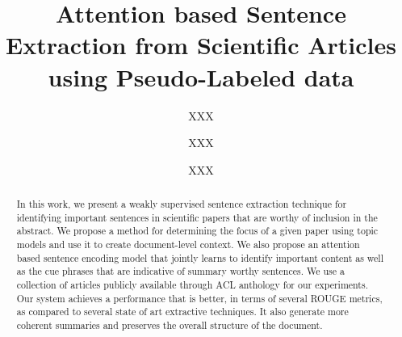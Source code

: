 \documentclass[sigconf]{acmart}
\begin{document}
\title{Attention based Sentence Extraction from Scientific Articles using Pseudo-Labeled data}


\author{XXX}


\author{XXX}

\author{XXX}


\begin{abstract}
In this work, we present a weakly supervised sentence extraction technique for identifying important sentences in scientific papers that are worthy of inclusion in the abstract. We propose a method for determining the focus of a given paper using topic models and use it to create document-level context. We also propose an attention based sentence encoding model that jointly learns to identify important content as well as the cue phrases that are indicative of summary worthy sentences. We use a collection of articles publicly available through ACL anthology for our experiments. Our system achieves a performance that is better, in terms of several ROUGE metrics, as compared to several state of art extractive techniques. It also generate more coherent summaries and preserves the overall structure of the document.
\end{abstract}

%
%



\maketitle





\end{document}
